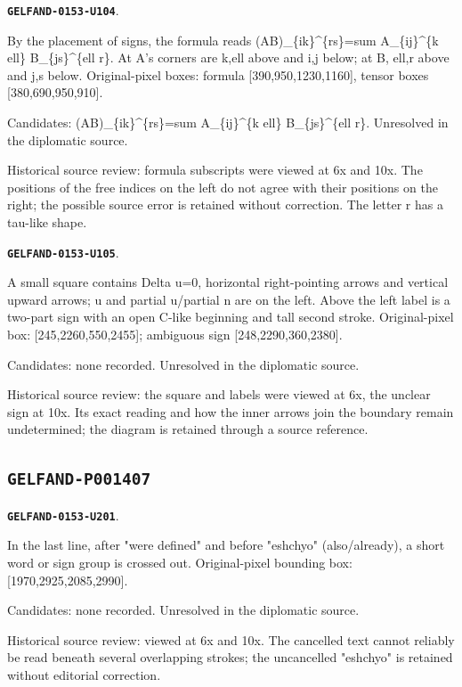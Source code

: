 \documentclass[11pt]{article}
\theoremstyle{definition}
\theoremstyle{remark}
\begin{document}
\par\noindent\leavevmode{}\label{GELFAND-0153-U104}\label{GELFAND-P001406:tensor-indices:note}\textbf{\texttt{GELFAND-0153-U104}}.\nopagebreak[4]\par
By the placement of signs, the formula reads (AB)\_\{ik\}\textasciicircum{}\{rs\}=sum A\_\{ij\}\textasciicircum{}\{k ell\} B\_\{js\}\textasciicircum{}\{ell r\}. At A's corners are k,ell above and i,j below; at B, ell,r above and j,s below. Original-pixel boxes: formula [390,950,1230,1160], tensor boxes [380,690,950,910].\par
Candidates: (AB)\_\{ik\}\textasciicircum{}\{rs\}=sum A\_\{ij\}\textasciicircum{}\{k ell\} B\_\{js\}\textasciicircum{}\{ell r\}. Unresolved in the diplomatic source.\par
Historical source review: formula subscripts were viewed at 6x and 10x. The positions of the free indices on the left do not agree with their positions on the right; the possible source error is retained without correction. The letter r has a tau-like shape.\par\medskip
\par\noindent\leavevmode{}\label{GELFAND-0153-U105}\label{GELFAND-P001406:boundary-diagram:note}\textbf{\texttt{GELFAND-0153-U105}}.\nopagebreak[4]\par
A small square contains Delta u=0, horizontal right-pointing arrows and vertical upward arrows; u and partial u/partial n are on the left. Above the left label is a two-part sign with an open C-like beginning and tall second stroke. Original-pixel box: [245,2260,550,2455]; ambiguous sign [248,2290,360,2380].\par
Candidates: none recorded. Unresolved in the diplomatic source.\par
Historical source review: the square and labels were viewed at 6x, the unclear sign at 10x. Its exact reading and how the inner arrows join the boundary remain undetermined; the diagram is retained through a source reference.\par\medskip
\subsection*{\texttt{GELFAND-P001407}}
\par\noindent\leavevmode{}\label{GELFAND-0153-U201}\label{GELFAND-P001407:last-line-cancellation:note}\textbf{\texttt{GELFAND-0153-U201}}.\nopagebreak[4]\par
In the last line, after "were defined" and before "eshchyo" (also/already), a short word or sign group is crossed out. Original-pixel bounding box: [1970,2925,2085,2990].\par
Candidates: none recorded. Unresolved in the diplomatic source.\par
Historical source review: viewed at 6x and 10x. The cancelled text cannot reliably be read beneath several overlapping strokes; the uncancelled "eshchyo" is retained without editorial correction.\par\medskip
\end{document}
